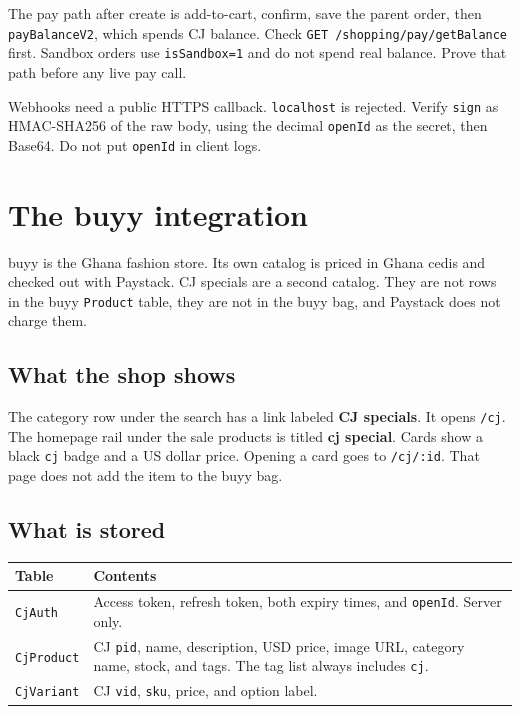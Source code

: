 \documentclass[11pt]{article}
\begin{document}
The pay path after create is add-to-cart, confirm, save the parent order, then \texttt{payBalanceV2}, which spends CJ balance. Check \texttt{GET /shopping/pay/getBalance} first. Sandbox orders use \texttt{isSandbox=1} and do not spend real balance. Prove that path before any live pay call.

Webhooks need a public HTTPS callback. \texttt{localhost} is rejected. Verify \texttt{sign} as HMAC-SHA256 of the raw body, using the decimal \texttt{openId} as the secret, then Base64. Do not put \texttt{openId} in client logs.

\section{The buyy integration}

buyy is the Ghana fashion store. Its own catalog is priced in Ghana cedis and checked out with Paystack. CJ specials are a second catalog. They are not rows in the buyy \texttt{Product} table, they are not in the buyy bag, and Paystack does not charge them.

\subsection{What the shop shows}

The category row under the search has a link labeled \textbf{CJ specials}. It opens \texttt{/cj}. The homepage rail under the sale products is titled \textbf{cj special}. Cards show a black \texttt{cj} badge and a US dollar price. Opening a card goes to \texttt{/cj/:id}. That page does not add the item to the buyy bag.

\subsection{What is stored}

\begin{center}
\begin{tabular}{@{}lp{9.5cm}@{}}
\toprule
Table & Contents \\
\midrule
\texttt{CjAuth} & Access token, refresh token, both expiry times, and \texttt{openId}. Server only. \\
\texttt{CjProduct} & CJ \texttt{pid}, name, description, USD price, image URL, category name, stock, and tags. The tag list always includes \texttt{cj}. \\
\texttt{CjVariant} & CJ \texttt{vid}, \texttt{sku}, price, and option label. \\
\bottomrule
\end{tabular}
\end{center}
\end{document}
